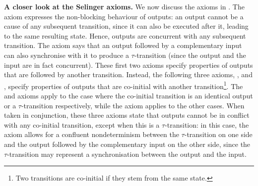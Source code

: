 

{\bfseries A closer look at the Selinger axioms.}
We now discuss the axioms in .
The \outputcommutativity axiom expresses the non-blocking behaviour of
outputs: %
an output cannot be a cause of any subsequent transition, since it can
also be executed after it, leading to the same resulting state. Hence,
outputs are concurrent with any subsequent transition.  The
\outputfeedback axiom says that an output followed by a complementary
input can also synchronise with it to produce a $\tau$-transition
(since the output and the input are in fact concurrent). These first
two axioms specify properties of outputs that are followed by another
transition. Instead, the following three axioms, \outputconfluence,
\outputdeterminacy and \outputtau, specify properties of outputs that
are co-initial with another transition\footnote{Two transitions are
  co-initial if they stem from the same state.}. The
\outputdeterminacy and \outputtau axioms apply to the case where the
co-initial transition is an identical output or a $\tau$-transition
respectively, while the \outputconfluence axiom applies to the other
cases.  When taken in conjunction, these three axioms state that outputs
cannot be in conflict %
with any co-initial transition, except when this is a
$\tau$-transition: in this case, the \outputtau axiom allows for a
confluent nondeterminism between the $\tau$-transition on one side and
the output followed by the complementary input on the other side,
since the $\tau$-transition may represent a synchronisation between the
output and the input.

